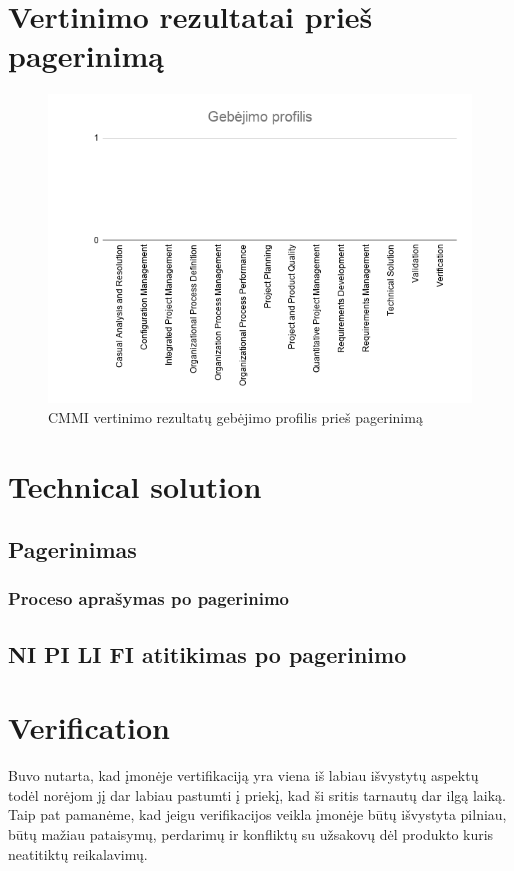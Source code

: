 \documentclass{VUMIFPSkursinis}
\begin{document}
	\section{Vertinimo rezultatai prieš pagerinimą}
	\begin{figure}[!htbp]
		\includegraphics[scale=0.8]{img/ProfilisPries}
		\caption{CMMI vertinimo rezultatų gebėjimo profilis prieš pagerinimą} %
		\label{img:ProfilisPries}
	\end{figure}
	\section{Technical solution}
		\subsection{Pagerinimas}
			\subsubsection{Proceso aprašymas po pagerinimo}
		\subsection{NI PI LI FI atitikimas po pagerinimo}
	\section{Verification}
		Buvo nutarta, kad įmonėje vertifikaciją yra viena iš labiau išvystytų aspektų todėl norėjom jį dar labiau pastumti į priekį, kad ši sritis tarnautų dar ilgą laiką. 
		Taip pat pamanėme, kad jeigu verifikacijos veikla įmonėje būtų išvystyta pilniau, būtų mažiau pataisymų, perdarimų ir konfliktų su užsakovų dėl produkto kuris neatitiktų reikalavimų.
\end{document}
